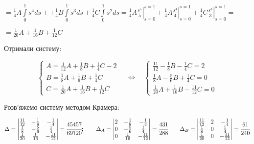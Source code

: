 \documentclass[a5paper, 20pt, titlepage]{article}
\newcommand{\Int}[1]{\int \limits_{0}^{1} #1 ds}
\begin{document}
\begin{enumerate}
\begin{enumerate}
\vspace{3mm}
\hspace{2mm}
$= \frac{1}{4} A \Int{s^4} + + \frac{1}{4} B\Int{s^3} + \frac{1}{4} C \Int{s^2} = \frac{1}{4} A \left. \frac{s^5}{5} \right|_{s = 0}^{s = 1} + \frac{1}{4} A \left. \frac{s^4}{4} \right|_{s = 0}^{s = 1} + \frac{1}{4} C \left. \frac{s^3}{3} \right|_{s = 0}^{s = 1} =$

\vspace{3mm}
\hspace{2mm}
$= \frac{1}{20} A + \frac{1}{16} B + \frac{1}{12} C$
\end{enumerate}

Отримали систему:

$$
\begin{cases}
A = \frac{1}{12} A + \frac{1}{8} B  + \frac{1}{4}C  - 2 \\
B = \frac{1}{8} A + \frac{1}{6} B + \frac{1}{4} C \\
C = \frac{1}{20} A + \frac{1}{16} B + \frac{1}{12} C
\end{cases}
\quad \Leftrightarrow \quad 
\begin{cases}
\frac{11}{12} - \frac{1}{8} B  - \frac{1}{4}C  = 2 \\
\frac{1}{8} A - \frac{5}{6} B + \frac{1}{4} C = 0 \\
\frac{1}{20} A + \frac{1}{16} B - \frac{11}{12} C = 0
\end{cases}
$$

Розв'яжемо систему методом Крамера:

$$\Delta = 
\begin{vmatrix}
\frac{11}{12} & -\frac{1}{8} & -\frac{1}{4} \\
\frac{1}{8}    & -\frac{5}{6} & \frac{1}{4}  \\
\frac{1}{20}  & \frac{1}{16} & -\frac{11}{12} \\  
\end{vmatrix}
=\cfrac{45457}{69120}; 
\qquad
\Delta_A =  
\begin{vmatrix}
2 & -\frac{1}{8} & -\frac{1}{4} \\
0    & -\frac{5}{6} & \frac{1}{4}  \\
0  & \frac{1}{16} & -\frac{11}{12} \\  
\end{vmatrix}
= \cfrac{431}{288}
\qquad
\Delta_B =  
\begin{vmatrix}
\frac{11}{12} & 2 & -\frac{1}{4} \\
\frac{1}{8}    & 0 & \frac{1}{4}  \\
\frac{1}{20}  & 0 & -\frac{11}{12} \\  
\end{vmatrix}
= \cfrac{61}{240}
$$


\end{enumerate}
\end{document}
